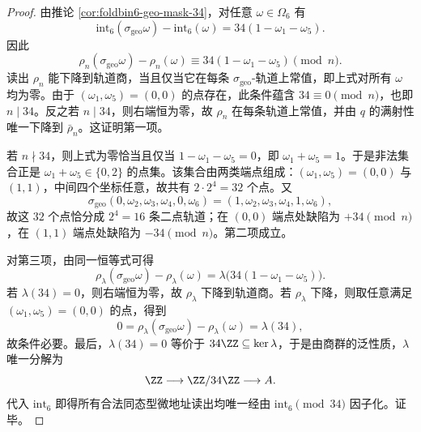 \begin{proof}
由推论 \ref{cor:foldbin6-geo-mask-34}，对任意 \(\omega\in\Omega_6\) 有
\[
\mathrm{int}_6(\sigma_{\mathrm{geo}}\omega)-\mathrm{int}_6(\omega)
=34(1-\omega_1-\omega_5).
\]
因此
\[
\rho_n(\sigma_{\mathrm{geo}}\omega)-\rho_n(\omega)
\equiv 34(1-\omega_1-\omega_5)\pmod n.
\]
读出 \(\rho_n\) 能下降到轨道商，当且仅当它在每条 \(\sigma_{\mathrm{geo}}\)-轨道上常值，即上式对所有 \(\omega\) 均为零。由于 \((\omega_1,\omega_5)=(0,0)\) 的点存在，此条件蕴含 \(34\equiv0\pmod n\)，也即 \(n\mid34\)。反之若 \(n\mid34\)，则右端恒为零，故 \(\rho_n\) 在每条轨道上常值，并由 \(q\) 的满射性唯一下降到 \(\bar\rho_n\)。这证明第一项。

若 \(n\nmid34\)，则上式为零恰当且仅当 \(1-\omega_1-\omega_5=0\)，即 \(\omega_1+\omega_5=1\)。于是非法集合正是 \(\omega_1+\omega_5\in\{0,2\}\) 的点集。该集合由两类端点组成：\((\omega_1,\omega_5)=(0,0)\) 与 \((1,1)\)，中间四个坐标任意，故共有 \(2\cdot2^4=32\) 个点。又
\[
\sigma_{\mathrm{geo}}(0,\omega_2,\omega_3,\omega_4,0,\omega_6)
=(1,\omega_2,\omega_3,\omega_4,1,\omega_6),
\]
故这 \(32\) 个点恰分成 \(2^4=16\) 条二点轨道；在 \((0,0)\) 端点处缺陷为 \(+34\pmod n\)，在 \((1,1)\) 端点处缺陷为 \(-34\pmod n\)。第二项成立。

对第三项，由同一恒等式可得
\[
\rho_\lambda(\sigma_{\mathrm{geo}}\omega)-\rho_\lambda(\omega)
=\lambda\bigl(34(1-\omega_1-\omega_5)\bigr).
\]
若 \(\lambda(34)=0\)，则右端恒为零，故 \(\rho_\lambda\) 下降到轨道商。若 \(\rho_\lambda\) 下降，则取任意满足 \((\omega_1,\omega_5)=(0,0)\) 的点，得到
\[
0=\rho_\lambda(\sigma_{\mathrm{geo}}\omega)-\rho_\lambda(\omega)=\lambda(34),
\]
故条件必要。最后，\(\lambda(34)=0\) 等价于 \(34\ZZ\subseteq\ker\lambda\)，于是由商群的泛性质，\(\lambda\) 唯一分解为
\[
\ZZ\longrightarrow \ZZ/34\ZZ\longrightarrow A.
\]
代入 \(\mathrm{int}_6\) 即得所有合法同态型微地址读出均唯一经由 \(\mathrm{int}_6\pmod{34}\) 因子化。证毕。
\end{proof}

